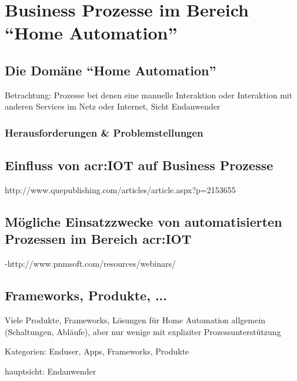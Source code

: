 
\chapter{Business Prozesse im Bereich "`Home Automation"'}


\section{Die Domäne "`Home Automation"'}

Betrachtung: Prozesse bei denen eine manuelle Interaktion oder Interaktion mit anderen Services im Netz oder Internet, Sicht Endanwender


\subsection{Herausforderungen \& Problemstellungen}



\section{Einfluss von \gls{acr:IOT} auf Business Prozesse}

http://www.quepublishing.com/articles/article.aspx?p=2153655

\section{Mögliche Einsatzzwecke von automatisierten Prozessen im Bereich \gls{acr:IOT}}

-http://www.pnmsoft.com/resources/webinars/

\section{Frameworks, Produkte, ...}
Viele Produkte, Frameworks, Lösungen für Home Automation allgemein (Schaltungen, Abläufe), aber nur wenige mit expliziter Prozessunterstützung

Kategorien: Enduser, Apps, Frameworks, Produkte

hauptsicht: Endanwender

